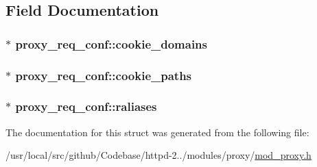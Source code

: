 \subsection{Field Documentation}
\subsubsection[{\texorpdfstring{cookie\+\_\+domains}{cookie_domains}}]{$\ast$ proxy\+\_\+req\+\_\+conf\+::cookie\+\_\+domains}\hypertarget{structproxy__req__conf_a24ab71c2e749d3a675c3e25289cf12c9}{}\label{structproxy__req__conf_a24ab71c2e749d3a675c3e25289cf12c9}
\subsubsection[{\texorpdfstring{cookie\+\_\+paths}{cookie_paths}}]{$\ast$ proxy\+\_\+req\+\_\+conf\+::cookie\+\_\+paths}\hypertarget{structproxy__req__conf_a396539f089759b6c17c2df8edc39241c}{}\label{structproxy__req__conf_a396539f089759b6c17c2df8edc39241c}
\subsubsection[{\texorpdfstring{raliases}{raliases}}]{$\ast$ proxy\+\_\+req\+\_\+conf\+::raliases}\hypertarget{structproxy__req__conf_a2a7db0adc7b6be3b7f280028b6ac19bb}{}\label{structproxy__req__conf_a2a7db0adc7b6be3b7f280028b6ac19bb}


The documentation for this struct was generated from the following file\+:\begin{DoxyCompactItemize}
\item 
/usr/local/src/github/\+Codebase/httpd-\/2../modules/proxy/\hyperlink{mod__proxy_8h}{mod\+\_\+proxy.\+h}\end{DoxyCompactItemize}
